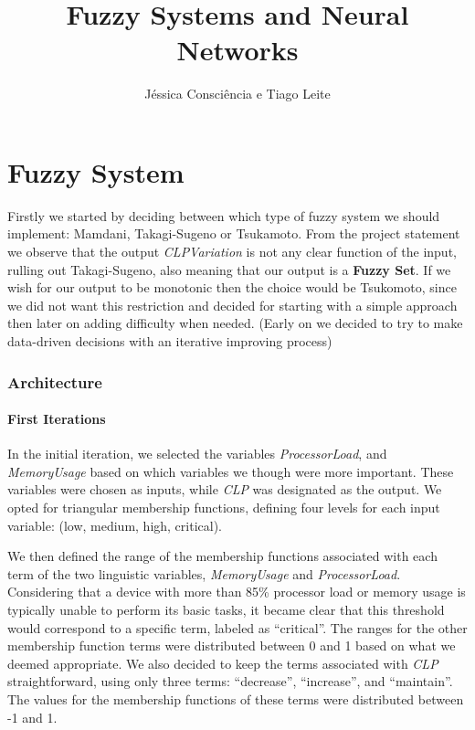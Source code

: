 \documentclass[titlepage]{article}
\title{Fuzzy Systems and Neural Networks}
\author{Jéssica Consciência e Tiago Leite}
\begin{document}
\maketitle
\newpage


\part{Fuzzy System}

Firstly we started by deciding between which type of fuzzy system
we should implement: Mamdani, Takagi-Sugeno or Tsukamoto.
From the project statement we observe that the output \textit{CLPVariation}
is not any clear function of the input, rulling out Takagi-Sugeno,
also meaning that our output is a \textbf{Fuzzy Set}. If we wish for
our output to be monotonic then the choice would be Tsukomoto, since
we did not want this restriction and decided for starting with a simple
approach then later on adding difficulty when needed.
(Early on we decided to try to make data-driven decisions with an iterative
improving process)
\section{Architecture}
\subsection{First Iterations}
\label{sec:first_iterations}

In the initial iteration, we selected the variables \textit{ProcessorLoad}, and \textit{MemoryUsage} based on which variables we though were more important.
These variables were chosen as inputs, while \textit{CLP} was designated as the output.
We opted for triangular membership functions, defining four levels for each input variable: (low, medium, high, critical).

We then defined the range of the membership functions associated with each term of the two linguistic variables, \textit{MemoryUsage} and \textit{ProcessorLoad}.
Considering that a device with more than 85\% processor load or memory usage is typically unable to perform its basic tasks,
it became clear that this threshold would correspond to a specific term, labeled as ``critical''.
The ranges for the other membership function terms were distributed between 0 and 1 based on what we deemed appropriate.
We also decided to keep the terms associated with \textit{CLP} straightforward, using only three terms: ``decrease'', ``increase'', and ``maintain''.
The values for the membership functions of these terms were distributed between -1 and 1.
\end{document}
